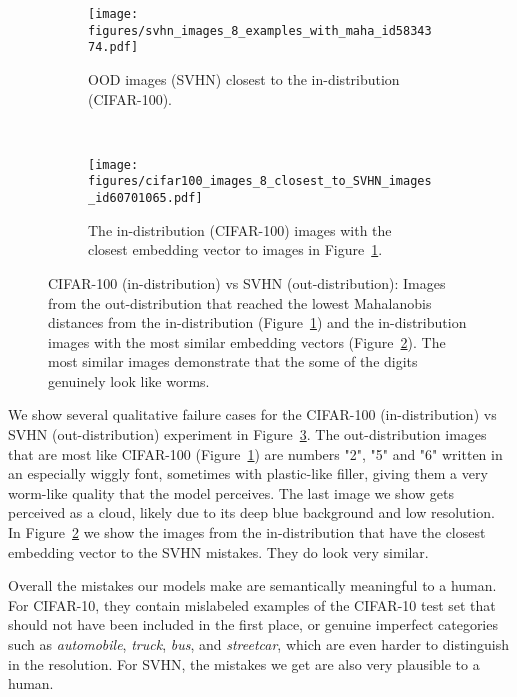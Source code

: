 \documentclass{article}
\begin{document}
\begin{figure}[ht]
	\centering
 \begin{subfigure}[h]{1.0\textwidth}{ 	\texttt{[image: figures/svhn\_images\_8\_examples\_with\_maha\_id5834374.pdf]}
          \caption{OOD images (SVHN) closest to the in-distribution (CIFAR-100).
          }
         \label{fig:svhn_mistaken_as_cifar100}
 }\end{subfigure}
 \\
  \begin{subfigure}[h]{1.0\textwidth}{ 	\texttt{[image: figures/cifar100\_images\_8\_closest\_to\_SVHN\_images\_id60701065.pdf]}
          \caption{The in-distribution (CIFAR-100) images with the closest embedding vector to images in Figure~\ref{fig:svhn_mistaken_as_cifar100}.}
         \label{fig:similar_cifar100_to_svhn}
 }\end{subfigure}
\caption{CIFAR-100 (in-distribution) vs SVHN (out-distribution): Images from the out-distribution that reached the lowest Mahalanobis distances from the in-distribution (Figure~\ref{fig:svhn_mistaken_as_cifar100}) and the in-distribution images with the most similar embedding vectors (Figure~\ref{fig:similar_cifar100_to_svhn}). The most similar images demonstrate that the some of the digits genuinely look like worms.}
	\vspace{-1em}
	\label{fig:mistakes_svhn}
\end{figure}
We show several qualitative failure cases for the CIFAR-100 (in-distribution) vs SVHN (out-distribution) experiment in Figure~\ref{fig:mistakes_svhn}.
The out-distribution images that are most like CIFAR-100 (Figure~\ref{fig:svhn_mistaken_as_cifar100}) are numbers "2", "5" and "6" written in an especially wiggly font, sometimes with plastic-like filler, giving them a very worm-like quality that the model perceives. The last image we show gets perceived as a cloud, likely due to its deep blue background and low resolution. In Figure~\ref{fig:similar_cifar100_to_svhn} we show the images from the in-distribution that have the closest embedding vector to the SVHN mistakes. They do look very similar.   

Overall the mistakes our models make are semantically meaningful to a human. For CIFAR-10, they contain mislabeled examples of the CIFAR-10 test set that should not have been included in the first place, or genuine imperfect categories such as \textit{automobile}, \textit{truck}, \textit{bus}, and \textit{streetcar}, which are even harder to distinguish in the  resolution. For SVHN, the mistakes we get are also very plausible to a human.
\end{document}
